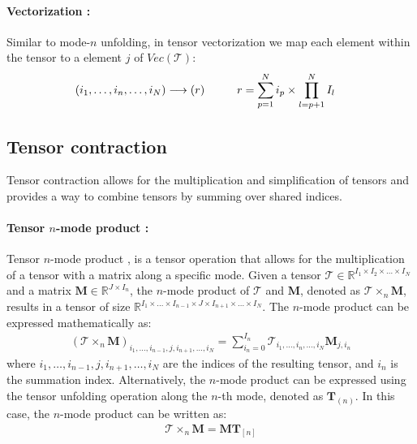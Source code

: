 \documentclass{article}
\begin{document}
\paragraph{Vectorization : }
\label{par:vectorization}
Similar to mode-$n$ unfolding, in tensor vectorization \cite{r4} we map each element within the tensor to a element $j$ of $Vec(\mathcal{T})$:
\begin{align}
	\label{eq:vectorization}
	&(i_1, \dots, i_n,\dots,i_N) \longrightarrow (r)\hspace{10mm} r = \sum_{\substack{p=1}}^{N} i_p \times \prod_{\substack{l=p+1}}^{N} I_l
\end{align}
\subsection{Tensor contraction}
\label{subsec:tensor-contraction}

Tensor contraction allows for the multiplication and simplification of tensors and provides a way to combine tensors by summing over shared indices.

\paragraph{Tensor $n$-mode product : }
Tensor $n$-mode product \cite{r4} , is a tensor operation that allows for the multiplication of a tensor with a matrix along a specific mode.
Given a tensor $\mathcal{T} \in \mathbb{R}^{I_1 \times I_2 \times \dots \times I_N}$ and a matrix $\mathbf{M} \in \mathbb{R}^{J \times I_n}$, the $n$-mode product of $\mathcal{T}$ and $\mathbf{M}$, denoted as $\mathcal{T} \times_n \mathbf{M}$, results in a tensor of size $\mathbb{R}^{I_1 \times \dots \times I_{n-1} \times J \times I_{n+1} \times \dots \times I_N}$. The $n$-mode product can be expressed mathematically as:
\begin{align}
	\label{eq:contraction}
	(\mathcal{T} \times_n \mathbf{M})_{i_1, \ldots, i_{n-1}, j, i_{n+1}, \ldots, i_N} = \sum_{i_n=0}^{I_n} \mathcal{T}_{i_1, \ldots, i_n, \ldots, i_N} \mathbf{M}_{j, i_n}
\end{align}
where $i_1, \dots, i_{n-1}, j, i_{n+1}, \dots, i_N$ are the indices of the resulting tensor, and $i_n$ is the summation index. Alternatively, the $n$-mode product can be expressed using the tensor unfolding operation along the $n$-th mode, denoted as $\mathbf{T}_{(n)}$. In this case, the $n$-mode product can be written as:
\begin{align}
	\label{eq:contraction2}
	\mathcal{T} \times_n \mathbf{M} = \mathbf{M} \mathbf{T}_{[n]}
\end{align}
\end{document}
